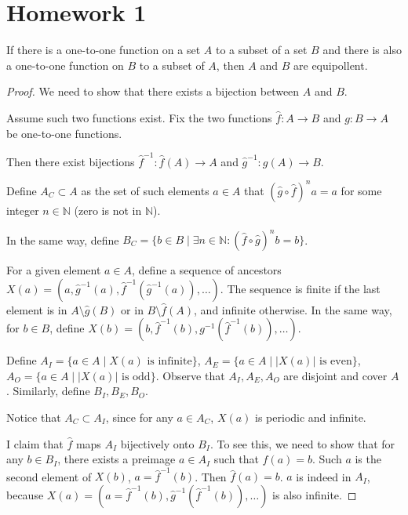\section{Homework 1}

\begin{theorem}
    If there is a one-to-one function on a set $A$ to a subset of a set $B$ and there is also a one-to-one function on $B$ to a subset of $A$, then $A$ and $B$ are equipollent.
\end{theorem}
\begin{proof}
    We need to show that there exists a bijection between $A$ and $B$.

    Assume such two functions exist. Fix the two functions $\widehat{f} : A \to B$ and $g : B \to A$ be one-to-one functions.

    Then there exist bijections $\widehat{f}^{-1} : \widehat{f}(A) \to A$ and $\widehat{g}^{-1} : g(A) \to B$.

    Define $A_C \subset A$ as the set of such elements $a \in A$ that $(\widehat{g} \circ \widehat{f})^n a = a$ for some integer $n \in \mathbb{N}$ (zero is not in $\mathbb{N}$). 
    
    In the same way, define $B_C = \{b \in B \; | \; \exists n \in \mathbb{N} : (\widehat{f} \circ \widehat{g})^n b = b\}$.

    For a given element $a \in A$, define a sequence of ancestors $X(a) = (a, \widehat{g}^{-1}(a), \widehat{f}^{-1}(\widehat{g}^{-1}(a)), \ldots)$. The sequence is finite if the last element is in $A \setminus \widehat{g}(B)$ or in $B \setminus \widehat{f}(A)$, and infinite otherwise. In the same way, for $b \in B$, define $X(b) = (b, \widehat{f}^{-1}(b), g^{-1}(\widehat{f}^{-1}(b)), \ldots)$.

    Define $A_I = \{a \in A \; | \; X(a) \text{ is infinite}\}$, $A_E = \{a \in A \; | \; |X(a)| \text{ is even}\}$, $A_O = \{a \in A \; | \; |X(a)| \text{ is odd}\}$. Observe that $A_I, A_E, A_O$ are disjoint and cover $A$. Similarly, define $B_I, B_E, B_O$.

    Notice that $A_C \subset A_I$, since for any $a \in A_C$, $X(a)$ is periodic and infinite.

    I claim that $\widehat{f}$ maps $A_I$ bijectively onto $B_I$. To see this, we need to show that for any $b \in B_I$, there exists a preimage $a \in A_I$ such that $\widehat{f}(a) = b$. Such $a$ is the second element of $X(b)$, $a = \widehat{f}^{-1}(b)$. Then $\widehat{f}(a) = b$. $a$ is indeed in $A_I$, because $X(a) = (a = \widehat{f}^{-1}(b), \widehat{g}^{-1}(\widehat{f}^{-1}(b)), \ldots)$ is also infinite.


\end{proof}
